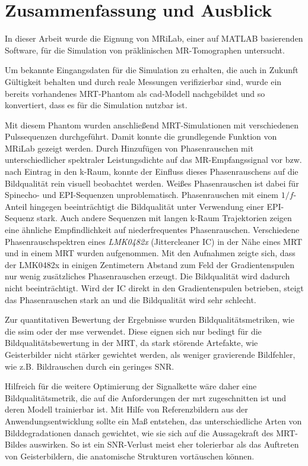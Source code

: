 \chapter{Zusammenfassung und Ausblick}
In dieser Arbeit wurde die Eignung von MRiLab, einer auf MATLAB basierenden Software, für die Simulation von präklinischen MR-Tomographen untersucht.

Um bekannte Eingangsdaten für die Simulation zu erhalten, die auch in Zukunft Gültigkeit behalten und durch reale Messungen verifizierbar sind, wurde ein bereits vorhandenes MRT-Phantom als \gls{cad}-Modell nachgebildet und so konvertiert, dass es für die Simulation nutzbar ist.

Mit diesem Phantom wurden anschließend MRT-Simulationen mit verschiedenen Pulssequenzen durchgeführt. Damit konnte die grundlegende Funktion von MRiLab gezeigt werden. Durch Hinzufügen von Phasen\-rauschen mit unterschiedlicher spektraler Leistungsdichte auf das MR-\-Empfangs\-signal vor bzw. nach Eintrag in den k-Raum, konnte der Einfluss dieses Phasenrauschens auf die Bildqualität rein visuell beobachtet werden. Weißes Phasenrauschen ist dabei für Spinecho- und EPI-Sequenzen unproblematisch. Phasenrauschen mit einem $1/f$-Anteil hingegen beeinträchtigt die Bildqualität unter Verwendung einer EPI-Sequenz stark. Auch andere Sequenzen mit langen k-Raum Trajektorien zeigen eine ähnliche Empfindlichkeit auf niederfrequentes Phasenrauschen. Verschiedene Phasenrauschspektren eines \textit{LMK0482x} (Jittercleaner IC) in der Nähe eines MRT und in einem MRT wurden aufgenommen. Mit den Aufnahmen zeigte sich, dass der LMK0482x in einigen Zentimetern Abstand zum Feld der Gradientenspulen nur wenig zusätzliches Phasenrauschen erzeugt. Die Bildqualität wird dadurch nicht beeinträchtigt. Wird der IC direkt in den Gradientenspulen betrieben, steigt das Phasenrauschen stark an und die Bildqualität wird sehr schlecht.

Zur quantitativen Bewertung der Ergebnisse wurden Bildqualitätsmetriken, wie die \gls{ssim} oder der \gls{mse} verwendet. Diese eignen sich nur bedingt für die Bildqualitätsbewertung in der MRT, da stark störende Artefakte, wie Geisterbilder nicht stärker gewichtet werden, als weniger gravierende Bildfehler, wie z.B. Bildrauschen durch ein geringes SNR.

Hilfreich für die weitere Optimierung der Signalkette wäre daher eine Bildqualitätsmetrik, die auf die Anforderungen der \gls{mrt} zugeschnitten ist und deren Modell trainierbar ist. Mit Hilfe von Referenzbildern aus der Anwendungsentwicklung sollte ein Maß entstehen, das unterschiedliche Arten von Bilddegradationen danach gewichtet, wie sie sich auf die Aussagekraft des MRT-Bildes auswirken. So ist ein SNR-Verlust meist eher tolerierbar als das Auftreten von Geisterbildern, die anatomische Strukturen vortäuschen können. 